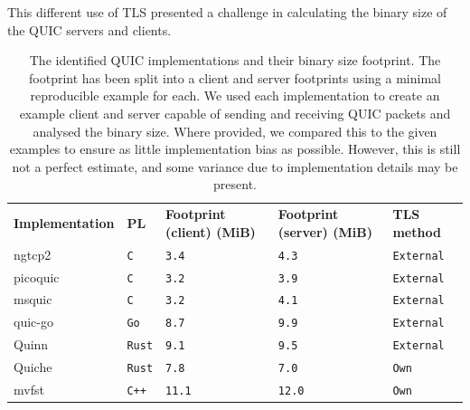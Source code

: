 This different use of TLS presented a challenge in calculating the binary size of the QUIC servers and clients.

\begin{table}[ht]
    \caption{The identified QUIC implementations and their binary size footprint. The footprint has been split into a client and server footprints using a minimal reproducible example for each. We used each implementation to create an example client and server capable of sending and receiving QUIC packets and analysed the binary size. Where provided, we compared this to the given examples to ensure as little implementation bias as possible. However, this is still not a perfect estimate, and some variance due to implementation details may be present.}\label{tab:quics}
    \begin{tabular}{@{}lp{18mm}p{29mm}p{29mm}l@{}}
        \toprule
        \textbf{Implementation} & \textbf{PL}   & \textbf{Footprint \newline (client) (MiB)} & \textbf{Footprint 
    \newline(server) (MiB)} & \textbf{TLS method} \\
        ngtcp2                  & \texttt{C}    & \texttt{3.4}                      & \texttt{4.3}                      & \texttt{External}   \\
        picoquic                & \texttt{C}    & \texttt{3.2}                      & \texttt{3.9}                      & \texttt{External}   \\
        msquic                  & \texttt{C}    & \texttt{3.2}                      & \texttt{4.1}                      & \texttt{External}   \\
        quic-go                 & \texttt{Go}   & \texttt{8.7}                      & \texttt{9.9}                      & \texttt{External}   \\
        Quinn                   & \texttt{Rust} & \texttt{9.1}                      & \texttt{9.5}                      & \texttt{External}   \\
        Quiche                  & \texttt{Rust} & \texttt{7.8}                      & \texttt{7.0}                      & \texttt{Own}        \\
        mvfst                   & \texttt{C++}  & \texttt{11.1}                     & \texttt{12.0}                     & \texttt{Own}        \\
        \bottomrule
    \end{tabular}
\end{table}

